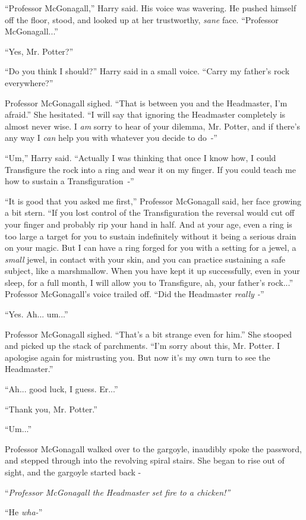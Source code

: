 ``Professor McGonagall,'' Harry said. His voice was wavering. He pushed himself off the floor, stood, and looked up at her trustworthy, \emph{sane} face. ``Professor McGonagall...''

``Yes, Mr. Potter?''

``Do you think I should?'' Harry said in a small voice. ``Carry my father's rock everywhere?''

Professor McGonagall sighed. ``That is between you and the Headmaster, I'm afraid.'' She hesitated. ``I will say that ignoring the Headmaster completely is almost never wise. I \emph{am} sorry to hear of your dilemma, Mr. Potter, and if there's any way I \emph{can} help you with whatever you decide to do~-''

``Um,'' Harry said. ``Actually I was thinking that once I know how, I could Transfigure the rock into a ring and wear it on my finger. If you could teach me how to sustain a Transfiguration~-''

``It is good that you asked me first,'' Professor McGonagall said, her face growing a bit stern. ``If you lost control of the Transfiguration the reversal would cut off your finger and probably rip your hand in half. And at your age, even a ring is too large a target for you to sustain indefinitely without it being a serious drain on your magic. But I can have a ring forged for you with a setting for a jewel, a \emph{small} jewel, in contact with your skin, and you can practice sustaining a safe subject, like a marshmallow. When you have kept it up successfully, even in your sleep, for a full month, I will allow you to Transfigure, ah, your father's rock...'' Professor McGonagall's voice trailed off. ``Did the Headmaster \emph{really -}''

``Yes. Ah... um...''

Professor McGonagall sighed. ``That's a bit strange even for him.'' She stooped and picked up the stack of parchments. ``I'm sorry about this, Mr. Potter. I apologise again for mistrusting you. But now it's my own turn to see the Headmaster.''

``Ah... good luck, I guess. Er...''

``Thank you, Mr. Potter.''

``Um...''

Professor McGonagall walked over to the gargoyle, inaudibly spoke the password, and stepped through into the revolving spiral stairs. She began to rise out of sight, and the gargoyle started back -

``\emph{Professor McGonagall the Headmaster set fire to a chicken!''}

``He \emph{wha-}''
